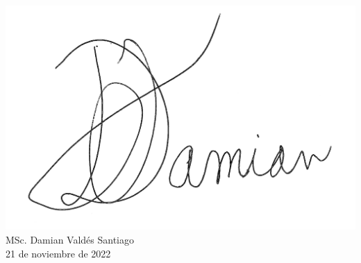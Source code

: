 \begin{opinion}
\begin{flushright}
\includegraphics[scale=0.2]{Graphics/firma_enhanced.jpg}\\
MSc. Damian Valdés Santiago\\
21 de noviembre de 2022    
\end{flushright}

\end{opinion}